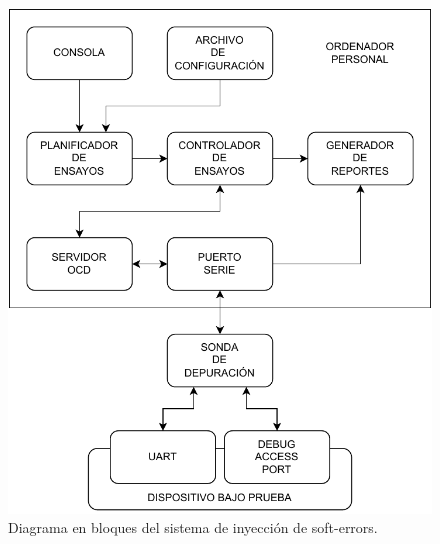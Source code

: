 \begin{figure}[htbp]
	\centering
	\includegraphics[width=\textwidth]{./Figures/siseblocks.pdf}
    \caption{Diagrama en bloques del sistema de inyección de soft-errors.}
	\label{fig:siseblocks}
\end{figure}

